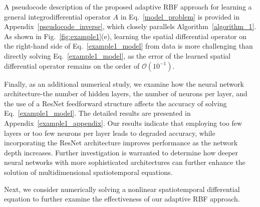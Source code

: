 \begin{example}
A pseudocode description of the proposed adaptive RBF approach for learning a general integrodifferential operator $A$ in Eq.~\eqref{model_problem} is provided in Appendix~\ref{pseudocode_inverse}, which closely parallels Algorithm~\ref{algorithm_1}. As shown in Fig.~\ref{fig:example1}(e), learning the spatial differential operator on the right-hand side of Eq.~\eqref{example1_model} from data is more challenging than directly solving Eq.~\eqref{example1_model}, as the error of the learned spatial differential operator remains on the order of $\mathcal{O}(10^{-1})$.


Finally, as an additional numerical study, we examine how the neural network architecture-the number of hidden layers, the number of neurons per layer, and the use of a ResNet feedforward structure affects the accuracy of solving Eq.~\eqref{example1_model}. The detailed results are presented in Appendix~\ref{example1_appendix}. Our results indicate that employing too few layers or too few neurons per layer leads to degraded accuracy, while incorporating the ResNet architecture improves performance as the network depth increases. Further investigation is warranted to determine how deeper neural networks with more sophisticated architectures can further enhance the solution of multidimensional spatiotemporal equations.





\end{example}
Next, we consider numerically solving a nonlinear spatiotemporal differential equation to further examine the effectiveness of our adaptive RBF approach.

